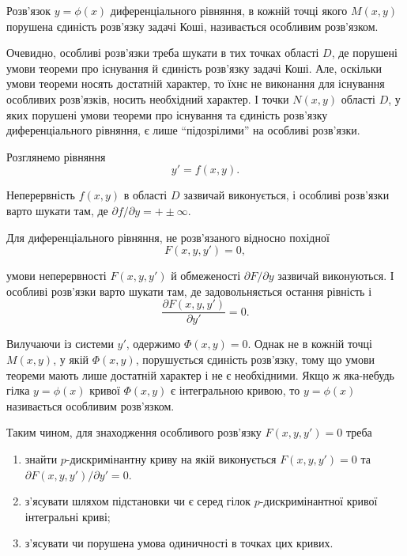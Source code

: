 \begin{definition}
	Розв'язок $y = \phi(x)$ диференціального рівняння, в кожній точці якого $M(x,y)$ порушена єдиність розв'язку задачі Коші, називається особливим розв'язком. 
\end{definition}

Очевидно, особливі розв'язки треба шукати в тих точках області $D$, де порушені умови теореми про існування й єдиність розв'язку задачі Коші. Але, оскільки умови теореми носять достатній характер, то їхнє не виконання для існування особливих розв'язків, носить необхідний характер. І точки $N(x,y)$ області $D$, у яких порушені умови теореми про існування та єдиність розв'язку диференціального рівняння, є лише ``підозрілими'' на особливі розв'язки. \parvskip

Розглянемо рівняння 
\begin{equation*}
	y' = f(x,y).
\end{equation*}

Неперервність $f(x,y)$ в області $D$ зазвичай виконується, і особливі роз\-в'яз\-ки варто шукати там, де $\partial f / \partial y = +\pm \infty$. \parvskip

Для диференціального рівняння, не роз\-в'яз\-а\-но\-го відносно похідної 
\begin{equation*}
	F(x, y, y') = 0,
\end{equation*}

умови неперервності $F(x,y,y')$ й обмеженості $\partial F / \partial y$ зазвичай виконуються. І особливі розв'язки варто шукати там, де задовольняється остання рівність і 
\begin{equation*}
	\frac{\partial F(x,y,y')}{\partial y'} = 0.
\end{equation*}

Вилучаючи із системи $y'$, одержимо $\Phi(x,y)=0$. Однак не в кожній точці $M(x,y)$, у якій $\Phi(x,y)$, порушується єдиність роз\-в'яз\-ку, тому що умови теореми мають лише достатній характер і не є необхідними. Якщо ж яка-небудь гілка $y=\phi(x)$ кривої $\Phi(x,y)$ є інтегральною кривою, то $y=\phi(x)$ називається особливим роз\-в'яз\-ком. \parvskip

Таким чином, для знаходження особливого роз\-в'яз\-ку $F(x, y, y') = 0$ треба
\begin{enumerate}
	\item знайти $p$-дискримінантну криву на якій виконується $F(x, y, y') = 0$ та $\partial F(x,y,y') / \partial y' = 0$.
	\item з'я\-су\-ва\-ти шляхом підстановки чи є серед гілок $p$-дискримінантної кривої інтегральні криві;
	\item з'я\-су\-ва\-ти чи порушена умова одиничності в точках цих кривих.
\end{enumerate}
